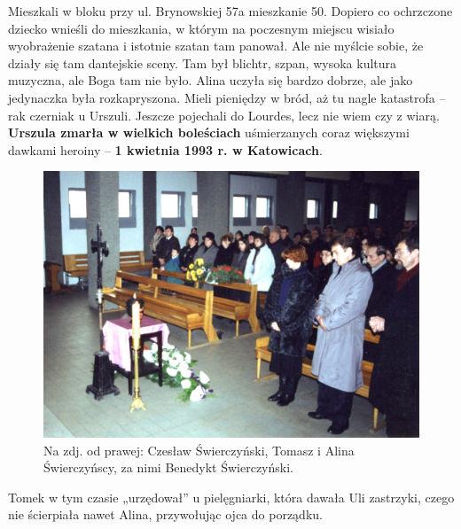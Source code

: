 Mieszkali w bloku przy ul. Brynowskiej 57a mieszkanie 50. Dopiero co ochrzczone dziecko wnieśli do mieszkania, w którym na poczesnym miejscu wisiało wyobrażenie szatana i istotnie szatan tam panował. Ale nie myślcie sobie, że działy się tam dantejskie sceny. Tam był blichtr, szpan, wysoka kultura muzyczna, ale Boga tam nie było. Alina uczyła się bardzo dobrze, ale jako jedynaczka była rozkapryszona. Mieli pieniędzy w bród, aż tu nagle katastrofa – rak czerniak u Urszuli. Jeszcze pojechali do Lourdes, lecz nie wiem czy z wiarą. \textbf{Urszula zmarła w wielkich boleściach} uśmierzanych coraz większymi dawkami heroiny – \textbf{1 kwietnia 1993 r. w Katowicach}.
\begin{figure}[!h]
\begin{center}
\includegraphics[width=\textwidth]{photo/urszula_swierczynska_pogrzeb.jpg}
\caption[Pogrzeb Urszuli Świerczyńskiej]{Na zdj. od prawej: Czesław Świerczyński, Tomasz i Alina Świerczyńscy, za nimi Benedykt Świerczyński.}
\end{center}
\end{figure}

Tomek w tym czasie „urzędował” u pielęgniarki, która dawała Uli zastrzyki, czego nie ścierpiała nawet Alina, przywołując ojca do porządku.

